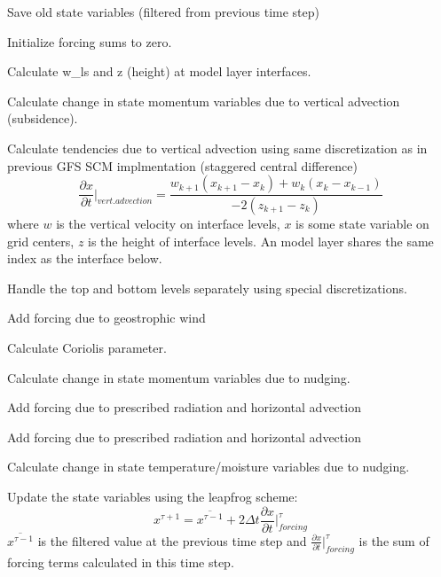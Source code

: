 \begin{DoxyItemize}
\item Save old state variables (filtered from previous time step)
\item Initialize forcing sums to zero.
\begin{DoxyItemize}
\item Calculate w\+\_\+ls and z (height) at model layer interfaces.
\end{DoxyItemize}
\item Calculate change in state momentum variables due to vertical advection (subsidence).
\begin{DoxyItemize}
\item Calculate tendencies due to vertical advection using same discretization as in previous G\+FS S\+CM implmentation (staggered central difference) \[ \frac{\partial x}{\partial t}|_{vert. advection} = \frac{w_{k+1}\left(x_{k+1} - x_{k}\right) + w_k\left(x_k - x_{k-1}\right)}{-2\left(z_{k+1}-z_{k}\right)} \] where $w$ is the vertical velocity on interface levels, $x$ is some state variable on grid centers, $z$ is the height of interface levels. An model layer shares the same index as the interface below.
\item Handle the top and bottom levels separately using special discretizations.
\end{DoxyItemize}
\item Add forcing due to geostrophic wind
\begin{DoxyItemize}
\item Calculate Coriolis parameter.
\end{DoxyItemize}
\item Calculate change in state momentum variables due to nudging.
\item Add forcing due to prescribed radiation and horizontal advection
\item Add forcing due to prescribed radiation and horizontal advection
\item Calculate change in state temperature/moisture variables due to nudging.
\item Update the state variables using the leapfrog scheme\+: \[ x^{\tau + 1} = \overline{x^{\tau - 1}} + 2\Delta t\frac{\partial x}{\partial t}|^\tau_{forcing} \] $\overline{x^{\tau - 1}}$ is the filtered value at the previous time step and $\frac{\partial x}{\partial t}|^\tau_{forcing}$ is the sum of forcing terms calculated in this time step.
\end{DoxyItemize}

